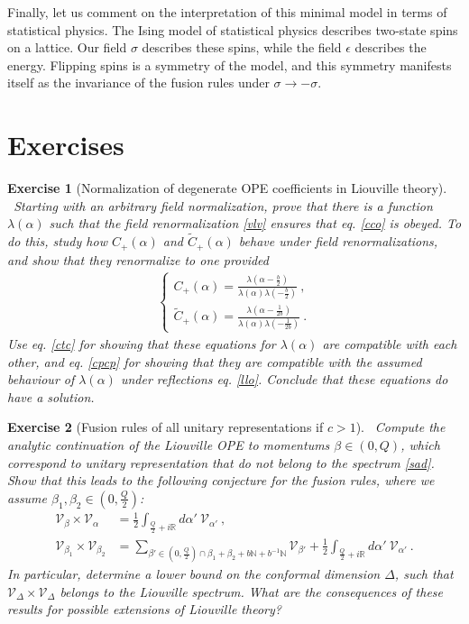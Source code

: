 \documentclass[12pt,a4paper,notitlepage]{report}
\numberwithin{equation}{section}
\theoremstyle{break}
\newtheorem{exo}{Exercise}[chapter]
\begin{document}
Finally, let us comment on the interpretation of this minimal model in terms of statistical physics.
The Ising model of statistical physics describes two-state spins on a lattice.
Our field $\sigma$ describes these spins, while the field $\epsilon$ describes the energy.
Flipping spins is a symmetry of the model, and this symmetry manifests itself as the invariance of the fusion rules under $\sigma\rightarrow -\sigma$. 

\section{Exercises}

\begin{exo}[Normalization of degenerate OPE coefficients in Liouville theory]
 ~\label{exonorm}
Starting with an arbitrary field normalization, prove that there is a function $\lambda(\alpha)$ such that the field renormalization \eqref{vlv} ensures that eq. \eqref{cco} is obeyed.
To do this, study how $C_+(\alpha)$ and $\tilde{C}_+(\alpha)$ behave under field renormalizations, and show that they renormalize to one provided
\begin{align}
\left\{\begin{array}{l} 
 C_+(\alpha) = \frac{\lambda(\alpha-\frac{b}{2})}{\lambda(\alpha)\lambda(-\frac{b}{2})} \ ,
\\
\tilde{C}_+(\alpha) = \frac{\lambda(\alpha-\frac{1}{2b})}{\lambda(\alpha)\lambda(-\frac{1}{2b})} \ .
\end{array}\right. 
\end{align}
Use eq. \eqref{ctc} for showing that these equations for $\lambda(\alpha)$ are compatible with each other, and eq. \eqref{cpcp} for showing that they are compatible with the  assumed behaviour of $\lambda(\alpha)$ under reflections eq. \eqref{llo}.
Conclude that these equations do have a solution.
\end{exo}

\begin{exo}[Fusion rules of all unitary representations if $c>1$]
 ~\label{exoaur}
Compute the analytic continuation of the Liouville OPE to momentums $\beta\in (0,Q)$, which correspond to unitary representation that do not belong to the spectrum \eqref{sad}. 
Show that this leads to the following conjecture for the fusion rules, where we assume $\beta_1,\beta_2\in (0,\frac{Q}{2})$:
\begin{align}
 \mathcal{V}_\beta \times \mathcal{V}_\alpha  
&= \frac12 \int_{\frac{Q}{2}+i\mathbb{R}} d\alpha'\ \mathcal{V}_{\alpha'}\ ,
\\
 \mathcal{V}_{\beta_1} \times \mathcal{V}_{\beta_2} 
&= \sum_{\beta'\in (0,\frac{Q}{2})\cap \beta_1+\beta_2 + b\mathbb{N}+b^{-1}\mathbb{N}} \mathcal{V}_{\beta'}  
+ \frac12 \int_{\frac{Q}{2}+i\mathbb{R}} d\alpha'\ \mathcal{V}_{\alpha'}\ .
\end{align}
In particular, determine a lower bound on the conformal dimension $\Delta$, such that $\mathcal{V}_\Delta \times \mathcal{V}_\Delta$ belongs to the Liouville spectrum.
What are the consequences of these results for possible extensions of Liouville theory?
\end{exo}
\end{document}
